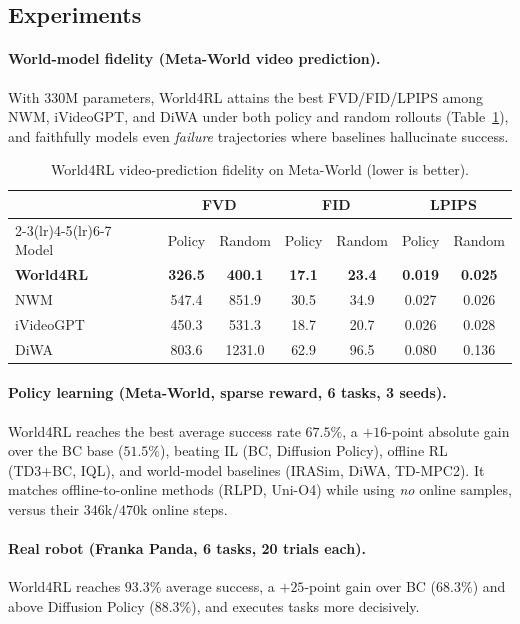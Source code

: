 \documentclass[11pt]{article}
\begin{document}
\subsection{Experiments}
\paragraph{World-model fidelity (Meta-World video prediction).} With 330M parameters, World4RL attains
the best FVD/FID/LPIPS among NWM, iVideoGPT, and DiWA under both policy and random rollouts
(Table~\ref{tab:w4rl-vp}), and faithfully models even \emph{failure} trajectories where baselines
hallucinate success.

\begin{table}[h]
\centering
\caption{World4RL video-prediction fidelity on Meta-World (lower is better).}
\label{tab:w4rl-vp}
\begin{tabular}{lcccccc}
\toprule
 & \multicolumn{2}{c}{FVD} & \multicolumn{2}{c}{FID} & \multicolumn{2}{c}{LPIPS}\\
\cmidrule(lr){2-3}\cmidrule(lr){4-5}\cmidrule(lr){6-7}
Model & Policy & Random & Policy & Random & Policy & Random\\
\midrule
\textbf{World4RL} & \textbf{326.5} & \textbf{400.1} & \textbf{17.1} & \textbf{23.4} & \textbf{0.019} & \textbf{0.025}\\
NWM       & 547.4 & 851.9 & 30.5 & 34.9 & 0.027 & 0.026\\
iVideoGPT & 450.3 & 531.3 & 18.7 & 20.7 & 0.026 & 0.028\\
DiWA      & 803.6 & 1231.0 & 62.9 & 96.5 & 0.080 & 0.136\\
\bottomrule
\end{tabular}
\end{table}

\paragraph{Policy learning (Meta-World, sparse reward, 6 tasks, 3 seeds).} World4RL reaches the best
average success rate $67.5\%$, a $+16$-point absolute gain over the BC base ($51.5\%$), beating IL
(BC, Diffusion Policy), offline RL (TD3+BC, IQL), and world-model baselines (IRASim, DiWA, TD-MPC2).
It matches offline-to-online methods (RLPD, Uni-O4) while using \emph{no} online samples, versus their
$346$k/$470$k online steps.

\paragraph{Real robot (Franka Panda, 6 tasks, 20 trials each).} World4RL reaches $93.3\%$ average
success, a $+25$-point gain over BC ($68.3\%$) and above Diffusion Policy ($88.3\%$), and executes
tasks more decisively.
\end{document}
